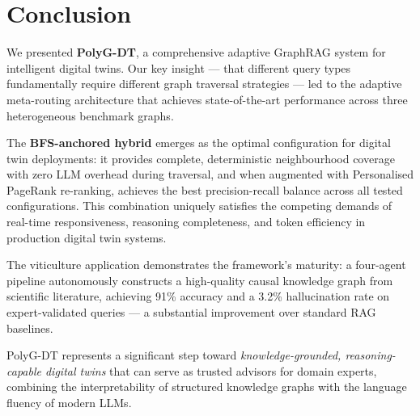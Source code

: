 \documentclass[12pt,a4paper]{article}
\begin{document}
\section{Conclusion}

We presented \textbf{PolyG-DT}, a comprehensive adaptive GraphRAG system
for intelligent digital twins. Our key insight — that different query types
fundamentally require different graph traversal strategies — led to the
adaptive meta-routing architecture that achieves state-of-the-art performance
across three heterogeneous benchmark graphs.

The \textbf{BFS-anchored hybrid} emerges as the optimal configuration for
digital twin deployments: it provides complete, deterministic neighbourhood
coverage with zero LLM overhead during traversal, and when augmented with
Personalised PageRank re-ranking, achieves the best precision-recall balance
across all tested configurations. This combination uniquely satisfies the
competing demands of real-time responsiveness, reasoning completeness, and
token efficiency in production digital twin systems.

The viticulture application demonstrates the framework's maturity: a
four-agent pipeline autonomously constructs a high-quality causal knowledge
graph from scientific literature, achieving 91\% accuracy and a 3.2\%
hallucination rate on expert-validated queries — a substantial improvement
over standard RAG baselines.

PolyG-DT represents a significant step toward \emph{knowledge-grounded,
reasoning-capable digital twins} that can serve as trusted advisors for
domain experts, combining the interpretability of structured knowledge graphs
with the language fluency of modern LLMs.
\end{document}
